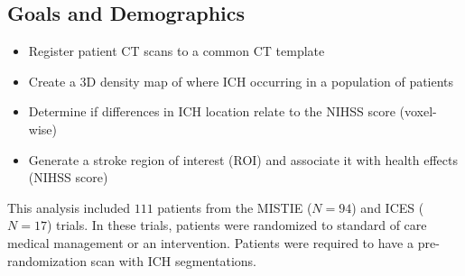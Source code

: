 \documentclass[final]{beamer}\usepackage[]{graphicx}\usepackage[]{color}
\begin{document}
\begin{frame}[fragile]
\begin{multicols}{2}
%
%
%


%


\section{Goals and Demographics}

\begin{minipage}{\linewidth}
\begin{multicols}{2}


\begin{itemize}
\item Register patient CT scans to a common CT template
\item Create a 3D density map of where ICH occurring in a population of patients 
\item Determine if differences in ICH location relate to the NIHSS score (voxel-wise)
\item Generate a stroke region of interest (ROI) and associate it with health effects (NIHSS score)
\end{itemize}

This analysis included $111$ patients from the MISTIE ($N = 94$) and ICES ($N = 17$) trials.  In these trials, patients were randomized to standard of care medical management or an intervention.  Patients were required to have a pre-randomization scan with ICH segmentations. 


\end{multicols}
\end{minipage}
\end{multicols}
\end{frame}
\end{document}
